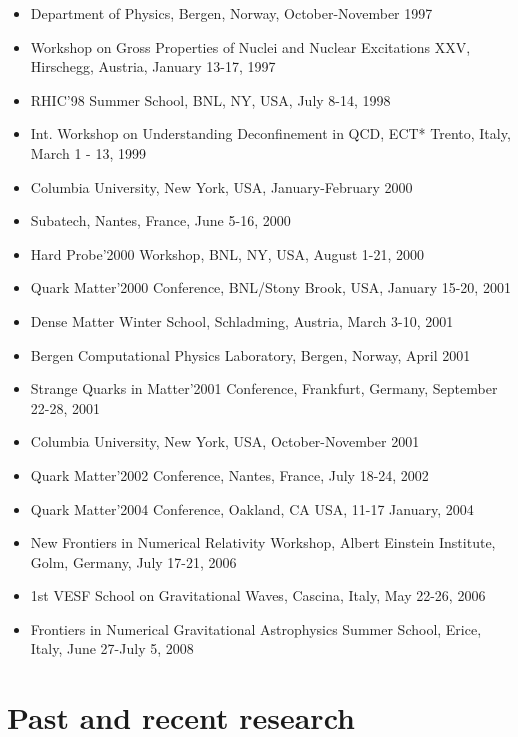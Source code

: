 \documentclass{article}[12pt]
\begin{document}
\begin{itemize}
\item Department of Physics, Bergen, Norway, October-November 1997
\item Workshop on Gross Properties of Nuclei and Nuclear Excitations XXV,
      Hirschegg, Austria,
      January 13-17, 1997
\item RHIC'98 Summer School, BNL, NY, USA, July 8-14, 1998
\item Int. Workshop on Understanding Deconfinement in QCD,
      ECT* Trento, Italy, March 1 - 13, 1999
\item Columbia University, New York, USA, January-February 2000
\item Subatech, Nantes, France, June 5-16, 2000
\item Hard Probe'2000 Workshop, BNL, NY, USA, August 1-21, 2000
\item Quark Matter'2000 Conference, BNL/Stony Brook, USA, January 15-20, 2001
\item Dense Matter Winter School, Schladming, Austria, March 3-10, 2001
\item Bergen Computational Physics Laboratory, Bergen, Norway, April 2001
\item Strange Quarks in Matter'2001 Conference, Frankfurt, Germany,
      September 22-28, 2001
\item Columbia University, New York, USA, October-November 2001
\item Quark Matter'2002 Conference, Nantes, France, July 18-24, 2002
\item Quark Matter'2004 Conference, Oakland, CA USA, 11-17 January, 2004
\item New Frontiers in Numerical Relativity Workshop,
      Albert Einstein Institute, Golm, Germany, July 17-21, 2006
\item 1st VESF School on Gravitational Waves, Cascina, Italy, May 22-26, 2006
\item Frontiers in Numerical Gravitational Astrophysics Summer School,
      Erice, Italy, June 27-July 5, 2008
\end{itemize}

\section*{Past and recent research}
\end{document}
